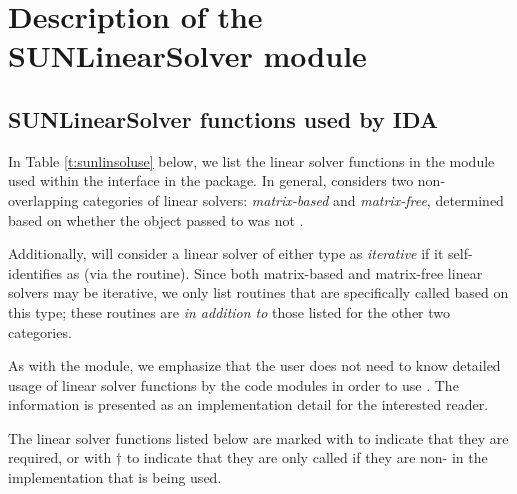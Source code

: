 \chapter{Description of the SUNLinearSolver module}\label{s:sunlinsol}



\section{SUNLinearSolver functions used by IDA}

In Table \ref{t:sunlinsoluse} below, we list the linear solver
functions in the {\sunlinsol} module used within the {\idals}
interface in the {\ida} package.  In general, {\idals} considers two
non-overlapping categories of linear solvers: \emph{matrix-based} and
\emph{matrix-free}, determined based on whether the {\sunmatrix}
object  passed to  was not .

Additionally, {\idals} will consider a linear solver of either type as
\emph{iterative} if it self-identifies as
 (via the 
routine).  Since both matrix-based and matrix-free linear solvers may
be iterative, we only list {\sunlinsol} routines that are specifically
called based on this type; these routines are \emph{in addition to} those
listed for the other two categories.

As with the {\sunmatrix} module, we emphasize that the {\ida} user
does not need to know detailed usage of linear solver functions by the
{\ida} code modules in order to use {\ida}. The information is
presented as an implementation detail for the interested reader.

The linear solver functions listed below are marked with \cm to
indicate that they are required, or with $\dagger$ to indicate that
they are only called if they are non- in the {\sunlinsol}
implementation that is being used.  

